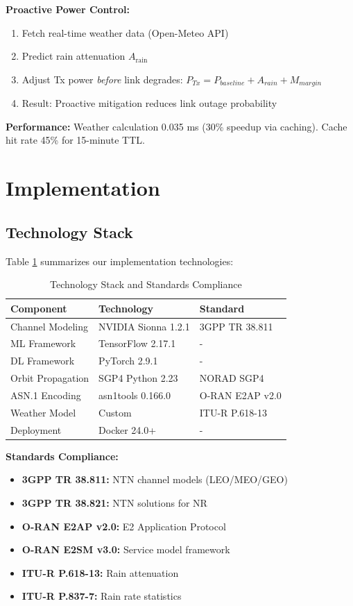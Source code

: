 \documentclass[conference]{IEEEtran}
\begin{document}
\textbf{Proactive Power Control:}
\begin{enumerate}
    \item Fetch real-time weather data (Open-Meteo API)
    \item Predict rain attenuation $A_{\text{rain}}$
    \item Adjust Tx power \textit{before} link degrades: $P_{Tx} = P_{baseline} + A_{rain} + M_{margin}$
    \item Result: Proactive mitigation reduces link outage probability
\end{enumerate}

\textbf{Performance:} Weather calculation 0.035 ms (30\% speedup via caching). Cache hit rate 45\% for 15-minute TTL.

\section{Implementation}

\subsection{Technology Stack}

Table \ref{tab:tech_stack} summarizes our implementation technologies:

\begin{table}[t]
\centering
\caption{Technology Stack and Standards Compliance}
\label{tab:tech_stack}
\scriptsize
\begin{tabular}{@{}lll@{}}
\toprule
\textbf{Component} & \textbf{Technology} & \textbf{Standard} \\
\midrule
Channel Modeling & NVIDIA Sionna 1.2.1 & 3GPP TR 38.811 \\
ML Framework & TensorFlow 2.17.1 & - \\
DL Framework & PyTorch 2.9.1 & - \\
Orbit Propagation & SGP4 Python 2.23 & NORAD SGP4 \\
ASN.1 Encoding & asn1tools 0.166.0 & O-RAN E2AP v2.0 \\
Weather Model & Custom & ITU-R P.618-13 \\
Deployment & Docker 24.0+ & - \\
\bottomrule
\end{tabular}
\end{table}

\textbf{Standards Compliance:}
\begin{itemize}
    \item \textbf{3GPP TR 38.811:} NTN channel models (LEO/MEO/GEO)
    \item \textbf{3GPP TR 38.821:} NTN solutions for NR
    \item \textbf{O-RAN E2AP v2.0:} E2 Application Protocol
    \item \textbf{O-RAN E2SM v3.0:} Service model framework
    \item \textbf{ITU-R P.618-13:} Rain attenuation
    \item \textbf{ITU-R P.837-7:} Rain rate statistics
\end{itemize}
\end{document}
